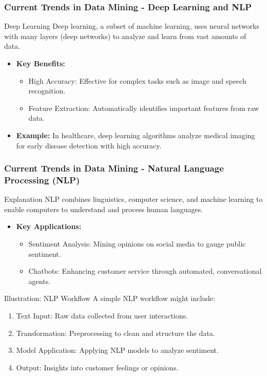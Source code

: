 \documentclass{beamer}
\begin{document}
\begin{frame}[fragile]
    \frametitle{Current Trends in Data Mining - Deep Learning and NLP}
    \begin{block}{Deep Learning}
        Deep learning, a subset of machine learning, uses neural networks with many layers (deep networks) to analyze and learn from vast amounts of data.
    \end{block}
    
    \begin{itemize}
        \item \textbf{Key Benefits:}
        \begin{itemize}
            \item High Accuracy: Effective for complex tasks such as image and speech recognition.
            \item Feature Extraction: Automatically identifies important features from raw data.
        \end{itemize}
        \item \textbf{Example:} In healthcare, deep learning algorithms analyze medical imaging for early disease detection with high accuracy.
    \end{itemize}
\end{frame}

\begin{frame}[fragile]
    \frametitle{Current Trends in Data Mining - Natural Language Processing (NLP)}
    \begin{block}{Explanation}
        NLP combines linguistics, computer science, and machine learning to enable computers to understand and process human languages.
    \end{block}
    
    \begin{itemize}
        \item \textbf{Key Applications:}
        \begin{itemize}
            \item Sentiment Analysis: Mining opinions on social media to gauge public sentiment.
            \item Chatbots: Enhancing customer service through automated, conversational agents.
        \end{itemize}
    \end{itemize}
    
    \begin{block}{Illustration: NLP Workflow}
        A simple NLP workflow might include:
        \begin{enumerate}
            \item Text Input: Raw data collected from user interactions.
            \item Transformation: Preprocessing to clean and structure the data.
            \item Model Application: Applying NLP models to analyze sentiment.
            \item Output: Insights into customer feelings or opinions.
        \end{enumerate}
    \end{block}
\end{frame}
\end{document}
